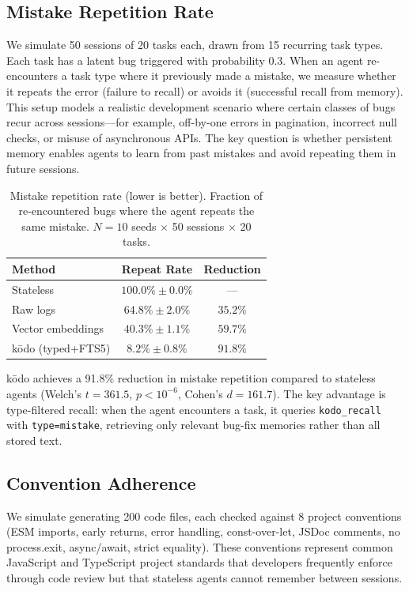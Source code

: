 \documentclass{article}
\begin{document}
\subsection{Mistake Repetition Rate}
\label{sec:mistakes}

We simulate 50 sessions of 20 tasks each, drawn from 15 recurring task types. Each task has a latent bug triggered with probability 0.3. When an agent re-encounters a task type where it previously made a mistake, we measure whether it repeats the error (failure to recall) or avoids it (successful recall from memory). This setup models a realistic development scenario where certain classes of bugs recur across sessions---for example, off-by-one errors in pagination, incorrect null checks, or misuse of asynchronous APIs. The key question is whether persistent memory enables agents to learn from past mistakes and avoid repeating them in future sessions.

\begin{table}[h]
\centering
\caption{Mistake repetition rate (lower is better). Fraction of re-encountered bugs where the agent repeats the same mistake. $N = 10$ seeds $\times$ 50 sessions $\times$ 20 tasks.}
\label{tab:mistakes}
\begin{tabular}{lcc}
\toprule
\textbf{Method} & \textbf{Repeat Rate} & \textbf{Reduction} \\
\midrule
Stateless & $100.0\% \pm 0.0\%$ & --- \\
Raw logs & $64.8\% \pm 2.0\%$ & $35.2\%$ \\
Vector embeddings & $40.3\% \pm 1.1\%$ & $59.7\%$ \\
k\=odo (typed+FTS5) & $\mathbf{8.2\% \pm 0.8\%}$ & $\mathbf{91.8\%}$ \\
\bottomrule
\end{tabular}
\end{table}

k\=odo achieves a 91.8\% reduction in mistake repetition compared to stateless agents (Welch's $t = 361.5$, $p < 10^{-6}$, Cohen's $d = 161.7$). The key advantage is type-filtered recall: when the agent encounters a task, it queries \texttt{kodo\_recall} with \texttt{type=mistake}, retrieving only relevant bug-fix memories rather than all stored text.

\subsection{Convention Adherence}
\label{sec:conventions}

We simulate generating 200 code files, each checked against 8 project conventions (ESM imports, early returns, error handling, const-over-let, JSDoc comments, no process.exit, async/await, strict equality). These conventions represent common JavaScript and TypeScript project standards that developers frequently enforce through code review but that stateless agents cannot remember between sessions.
\end{document}
